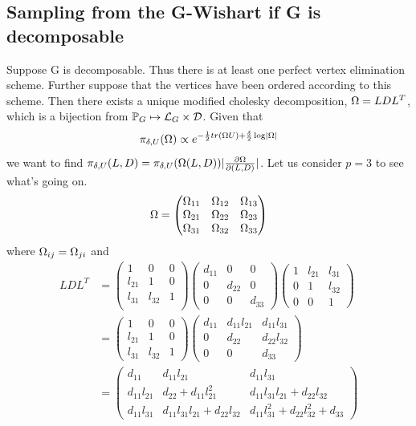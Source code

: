 \documentclass[12pt, leqno]{article}
\providecommand{\abs}[1]{\lvert#1\rvert}
\def\om{\ensuremath\Omega}
\def\pg{\ensuremath\mathbb{P}_{{G}}}
\begin{document}
\subsection{Sampling from the G-Wishart if G is decomposable}
\label{sec:samplinggwishart}
Suppose G is decomposable. Thus there is at least one perfect vertex
elimination scheme. Further suppose that the vertices have been
ordered according to this scheme. Then there exists a unique modified
cholesky decomposition, $\om = LDL^T$, which is a bijection from $\pg
\mapsto \mathcal{L}_G \times \mathcal{D}$. Given that 
\[
\pi_{\delta,U}(\om) \propto e^{-\frac{1}{2}tr(\om U) +
  \frac{\delta}{2} \log \abs{\om}}
\]
we want to find $\pi_{\delta,U} (L,D) = \pi_{\delta,U} (\om(L,D))
\abs{\frac{\partial \om}{\partial (L,D)}}$. Let us consider $p = 3$ to
see what's going on. 
\begin{align*}
\om = \begin{pmatrix} \om_{11} & \om_{12} & \om_{13}\\
\om_{21}& \om_{22} &  \om_{23} \\
\om_{31}& \om_{32} &  \om_{33} \\
\end{pmatrix}
\end{align*} 
where $\om_{ij} = \om_{ji}$ and
\begin{align*}
LDL^T &= \begin{pmatrix} 1 & 0 & 0\\
l_{21}& 1 &  0 \\
l_{31}& l_{32} &  1 \\
\end{pmatrix}
\begin{pmatrix} d_{11} & 0 & 0\\
0& d_{22} &  0 \\
0&0 &  d_{33} 
\end{pmatrix}
\begin{pmatrix} 1 & l_{21} & l_{31}\\
0& 1 &   l_{32}\\
0&0 & 1 
\end{pmatrix} \\
&= \begin{pmatrix} 1 & 0 & 0\\
l_{21}& 1 &  0 \\
l_{31}& l_{32} &  1 
\end{pmatrix}
\begin{pmatrix} d_{11} & d_{11} l_{21} & d_{11} l_{31}\\
0& d_{22}  &   d_{22} l_{32}\\
0&0 &  d_{33}
\end{pmatrix}\\
&= \begin{pmatrix} d_{11} & d_{11} l_{21} & d_{11} l_{31}\\
d_{11} l_{21}& d_{22} + d_{11} l_{21}^2 &   d_{11} l_{31}l_{21}+ d_{22} l_{32}\\
d_{11} l_{31}&d_{11} l_{31}l_{21}+ d_{22} l_{32}&  d_{11} l_{31}^2+ d_{22} l_{32}^2 +d_{33}
\end{pmatrix}
\end{align*}
\end{document}
